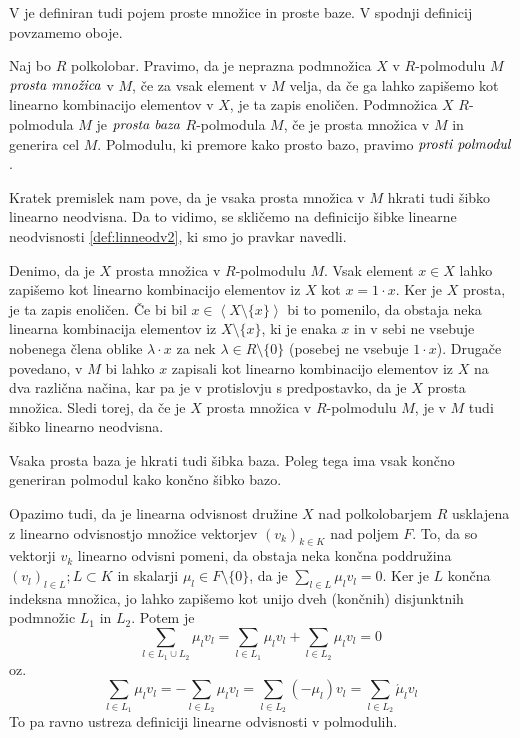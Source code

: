 \documentclass[mat1]{fmfdelo}
\newcommand{\pojem}[1]{\ensuremath{\emph{#1}}}
\newcommand{\Gen}[1]{\ensuremath{\left<{#1}\right>}}
\begin{document}
V \cite[definicija 2.~3.]{bib:Tanbase} je definiran tudi pojem proste množice in proste baze. V spodnji definicij povzamemo oboje.
\begin{definicija}
	Naj bo $R$ polkolobar. Pravimo, da je neprazna podmnožica $X$ v $R$-polmodulu $M$ \pojem{prosta množica} v $M$, če za vsak element v $M$ velja, da če ga lahko zapišemo kot linearno kombinacijo elementov v $X$, je ta zapis enoličen.
	Podmnožica $X$ $R$-polmodula $M$ je \pojem{prosta baza} $R$-polmodula $M$, če je prosta množica v $M$ in generira cel $M$. Polmodulu, ki premore kako prosto bazo, pravimo \pojem{prosti polmodul}.
\end{definicija}

Kratek premislek nam pove, da je vsaka prosta množica v $M$ hkrati tudi šibko linearno neodvisna. Da to vidimo, se skličemo na definicijo šibke linearne neodvisnosti \ref{def:linneodv2}, ki smo jo pravkar navedli.

Denimo, da je $X$ prosta množica v $R$-polmodulu $M$. Vsak element $x\in X$ lahko zapišemo kot linearno kombinacijo elementov iz $X$ kot $x = 1\cdot x$. Ker je $X$ prosta, je ta zapis enoličen. Če bi bil $x \in\Gen{X\setminus\{x\}}$ bi to pomenilo, da obstaja neka linearna kombinacija elementov iz $X\setminus\{x\}$, ki je enaka $x$ in v sebi ne vsebuje nobenega člena oblike $\lambda\cdot x$ za nek $\lambda\in R\setminus\{0\}$ (posebej ne vsebuje $1\cdot x$). Drugače povedano, v $M$ bi lahko $x$ zapisali kot linearno kombinacijo elementov iz $X$ na dva različna načina, kar pa je v protislovju s predpostavko, da je $X$ prosta množica. Sledi torej, da če je $X$ prosta množica v $R$-polmodulu $M$, je v $M$ tudi šibko linearno neodvisna.

\begin{opomba}
	Vsaka prosta baza je hkrati tudi šibka baza. Poleg tega ima vsak končno generiran polmodul kako končno šibko bazo.
\end{opomba}

Opazimo tudi, da je linearna odvisnost družine $X$ nad polkolobarjem $R$ usklajena z linearno odvisnostjo množice vektorjev $(v_k)_{k\in K}$ nad poljem $F$.
To, da so vektorji $v_k$ linearno odvisni pomeni, da obstaja neka končna poddružina $(v_l)_{l\in L}; L\subset K$ in skalarji $\mu_l\in F\setminus\{0\}$, da je $\sum_{l\in L}\mu_lv_l = 0$. Ker je $L$ končna indeksna množica, jo lahko zapišemo kot unijo dveh (končnih) disjunktnih podmnožic $L_1$ in $L_2$. Potem je $$ \sum_{l\in L_1\cup L_2} \mu_lv_l = \sum_{l\in L_1}\mu_lv_l + \sum_{l\in L_2}\mu_lv_l = 0$$ oz. $$\sum_{l\in L_1}\mu_lv_l = - \sum_{l\in L_2}\mu_lv_l = \sum_{l\in L_2} (-\mu_l)v_l = \sum_{l\in L_2}\acute{\mu}_lv_l $$
To pa ravno ustreza definiciji linearne odvisnosti v polmodulih. 
\end{document}
